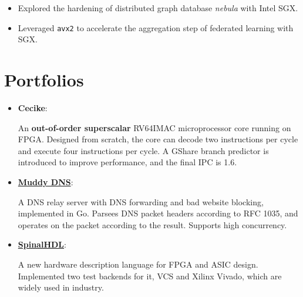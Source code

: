 \documentclass{resume}
\newcommand{\en}[1]{#1}
\newcommand{\zh}[1]{}
\begin{document}
\en{}
\zh{\datedsubsection{\textbf{清华大学信息技术研究院}}{10/2019 -- 04/2020}}
\en{}
\zh{\role{网络安全实验室}{科研实习}}
\begin{itemize}
      \item \en{Explored the hardening of distributed graph database \textit{nebula} with Intel SGX.}
            \zh{探索使用 Intel SGX 技术对分布式图数据库 \textit{nebula} 进行加固。}
      \item \en{Leveraged \texttt{avx2} to accelerate the aggregation step of federated learning with SGX.}
            \zh{利用 \texttt{avx2} 指令集加速了 SGX 技术下联邦学习的模型聚合。}
\end{itemize}

\section{\en{Portfolios}\zh{个人项目}}
\begin{itemize}[parsep=0.25ex]
      \item \textbf{Cecike}:
            \en{
                An \textbf{out-of-order superscalar} RV64IMAC microprocessor core running on FPGA.
                Designed from scratch, the core can decode two instructions per cycle and execute four instructions per cycle.
                A GShare branch predictor is introduced to improve performance, and the final IPC is 1.6.
            }
            \zh{
                运行于 FPGA 上的\textbf{乱序超标量} RV64IMAC 微处理器核。
                从零开始设计的乱序双发射处理器架构，每周期最多可以同时解码两条指令，执行四条指令。
                在前端引入 GShare 分支预测器以提升性能，最终运行测试程序时的 IPC 为 1.6。}
      \item \textbf{\href{https://github.com/name1e5s/MuddyDNS}{Muddy DNS}}:
            \en{
                A DNS relay server with DNS forwarding and bad website blocking, implemented in Go.
                Parsees DNS packet headers according to RFC 1035, and operates on the packet according to the result.
                Supports high concurrency.
            }
            \zh{支持 DNS 转发及不良网址拦截的中继服务器，使用 Go 实现。按照 RFC 1035 所述规范解析 DNS 包头，根据处理后的结果对 DNS 包进行操作，支持高并发。}
      \item \textbf{\href{https://github.com/SpinalHDL/SpinalHDL}{SpinalHDL}}:
            \en{
                A new hardware description language for FPGA and ASIC design.
                Implemented two test backends for it, VCS and Xilinx Vivado, which are widely used in industry.
            }
            \zh{SpinalHDL 是新一代的硬件语言。为其实现了将 VCS 以及 Xilinx Vivado 两大工业仿真套件作为测试后端，得到广泛好评。}
\end{itemize}
\end{document}
